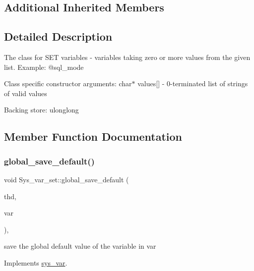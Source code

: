 \subsection*{Additional Inherited Members}


\subsection{Detailed Description}
The class for S\+ET variables -\/ variables taking zero or more values from the given list. Example\+: @sql\+\_\+mode

Class specific constructor arguments\+: char$\ast$ values\mbox{[}\mbox{]} -\/ 0-\/terminated list of strings of valid values

Backing store\+: ulonglong 

\subsection{Member Function Documentation}
\mbox{\label{classSys__var__set_a4992f46b91be120dd3a574950870d1fb}} 
\subsubsection{\texorpdfstring{global\+\_\+save\+\_\+default()}{global\_save\_default()}}
{\footnotesize\ttfamily void Sys\+\_\+var\+\_\+set\+::global\+\_\+save\+\_\+default (\begin{DoxyParamCaption}\item[{T\+HD $\ast$}]{thd,  }\item[{\mbox{\hyperlink{classset__var}{set\+\_\+var}} $\ast$}]{var }\end{DoxyParamCaption})\hspace{0.3cm}{\ttfamily [inline]}, {\ttfamily [virtual]}}

save the global default value of the variable in var 

Implements \mbox{\hyperlink{classsys__var}{sys\+\_\+var}}.

\mbox{\label{classSys__var__set_a810f24aa8b5a4b114b1ad71fceaebbd1}} 
